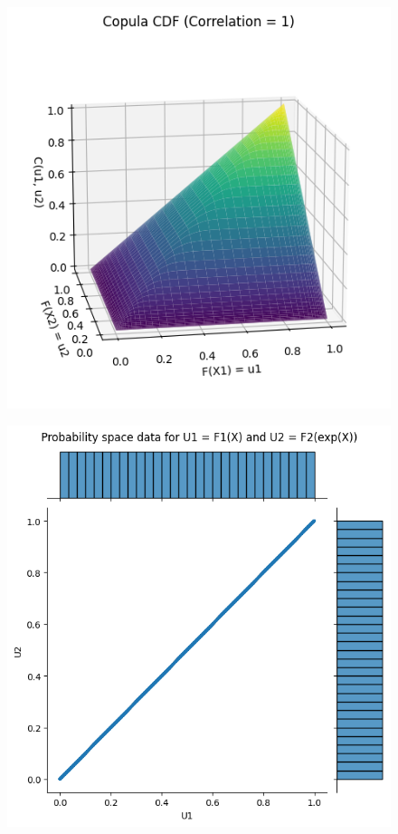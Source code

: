 \begin{figure}
    \centering
    \begin{minipage}{0.25\textwidth}
        \centering
        \includegraphics[width=\textwidth]{3Theory/pictures/TrueCopulaExponential.png}
        \label{fig:TrueCopulaExponential}
    \end{minipage}
    \hfill
    \begin{minipage}{0.25\textwidth}
        \centering
        \includegraphics[width=\textwidth]{3Theory/pictures/exponentialDependenceScatterProb.png}

\end{minipage}
\end{figure}
